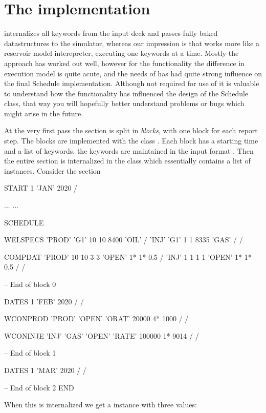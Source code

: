 \section{The  implementation}
\flow{} internalizes all keywords from the input deck and passes fully baked
datastructures to the simulator, whereas our impression is that \eclipse{} works
more like a reservoir model interepreter, executing one keywords at a time.
Mostly the \flow{} approach has worked out well, however for the \actionx{}
functionality the difference in execution model is quite acute, and the needs of
\actionx{} has had quite strong influence on the final Schedule implementation.
Although not required for use of \actionx{} it is valuable to understand how the
\actionx{} functionality has influenced the design of the Schedule class, that
way you will hopefully better understand problems or bugs which might arise in
the future.

At the very first pass the  section is split in \emph{blocks}, with
one block for each report step. The blocks are implemented with the class
. Each block has a starting time and a list of
keywords, the keywords are maintained in the input format
. Then the entire  section is internalized
in the class  which essentially contains a list of
 instances. Consider the  section
\begin{deck}
START
  1 'JAN' 2020 /

...
...

SCHEDULE

WELSPECS
	'PROD'	'G1'	10	10	8400	'OIL' /
	'INJ'	'G1'	1	1	8335	'GAS' /
/

COMPDAT
	'PROD'	10	10	3	3	'OPEN'	1*	1*	0.5 /
	'INJ'	1	1	1	1	'OPEN'	1*	1*	0.5 /
/

-- End of block 0

DATES
   1 'FEB' 2020 /
/

WCONPROD
	'PROD' 'OPEN' 'ORAT' 20000 4* 1000 /
/

WCONINJE
	'INJ'	'GAS'	'OPEN'	'RATE'	100000 1* 9014 /
/

-- End of block 1

DATES
  1 'MAR' 2020 /
/

-- End of block 2
END

\end{deck}

When this is internalized we get a  instance with three
 values:

